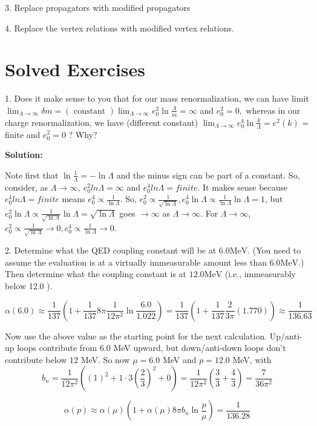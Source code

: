 3. Replace propagators with modified propagators

4. Replace the vertex relations with modified vertex relations.

\section{Solved Exercises}
1. Does it make sense to you that for our mass renormalization, we can have limit $\lim_{\Lambda\to\infty}\delta m=(\text { constant }) \lim_{\Lambda\to\infty} e_{0}^{2} \ln \frac{\Lambda}{m}=\infty$ and $e_{0}^{2}=0,$ whereas in our charge renormalization, we have (different constant) $\lim_{\Lambda\to\infty}e_{0}^{4} \ln \frac{k}{\Lambda}=e^{2}(k)$ = finite and $e_{0}^{2}=0$ ? Why?

\textbf{Solution:}

Note first that $\ln \frac{1}{\Lambda}=-\ln \Lambda$ and the minus sign can be part of a constant. So, consider, as $\Lambda\to\infty$, $e^2_0ln\Lambda=\infty$ and $e^4_0ln\Lambda=finite$. It makes sense because $e^4_0ln\Lambda=finite$ means $e_{0}^{4} \propto \frac{1}{\ln \Lambda}$. So, $e_{0}^{2} \propto \frac{1}{\sqrt{\ln \Lambda}}, e_{0}^{4} \ln \Lambda \propto \frac{1}{\ln \Lambda} \ln \Lambda=1$, but $e_{0}^{2} \ln \Lambda \propto \frac{1}{\sqrt{\ln \Lambda}} \ln \Lambda=\sqrt{\ln \Lambda}$ goes $\to\infty$ as $\Lambda\to\infty$. For $\Lambda\to\infty$,$e_{0}^{2} \propto \frac{1}{\sqrt{\ln \Lambda}} \rightarrow 0 , e_{0}^{4} \propto \frac{1}{\ln \Lambda} \rightarrow 0$.

2. Determine what the QED coupling constant will be at $6.0 \mathrm{MeV}$. (You need to assume the evaluation is at a virtually immeasurable amount less than $6.0 \mathrm{MeV}$.) Then determine what the coupling constant is at $12.0 \mathrm{MeV}$ (i.e., immeasurably below 12.0 ).

$$
\alpha(6.0) \approx\frac{1}{137}\left(1+\frac{1}{137} 8 \pi\frac{1}{12 \pi^{2}} \ln \frac{6.0}{1.022}\right)=\frac{1}{137}\left(1+\frac{1}{137} \frac{2}{3 \pi}(1.770)\right)\approx \frac{1}{136.63}
$$

Now use the above value as the starting point for the next calculation. Up/anti-up loops contribute from $6.0$ MeV upward, but down/anti-down loops don't contribute below 12 MeV. So now $\mu=6.0$ MeV and $p=12.0$ MeV, with 
$$b_{n}=\frac{1}{12 \pi^{2}}\left((1)^{2}+1 \cdot 3\left(\frac{2}{3}\right)^{2}+0\right)=\frac{1}{12 \pi^{2}}\left(\frac{3}{3}+\frac{4}{3}\right)=\frac{7}{36 \pi^{2}}$$

$$\alpha(p) \approx \alpha(\mu)\left(1+\alpha(\mu) 8 \pi b_{n} \ln \frac{p}{\mu}\right)=\frac{1}{136.28}$$